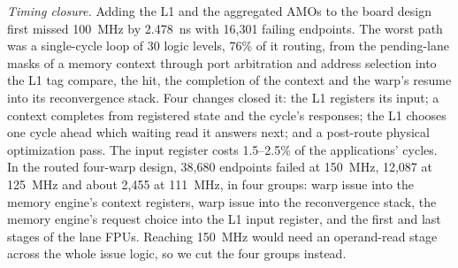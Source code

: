 \emph{Timing closure.} Adding the L1 and the aggregated AMOs to the board design first
missed 100~MHz by 2.478~ns with 16,301 failing endpoints. The worst path was a
single-cycle loop of 30 logic levels, 76\% of it routing, from the pending-lane masks of
a memory context through port arbitration and address selection into the L1 tag
compare, the hit, the completion of the context and the warp's resume into its
reconvergence stack. Four changes closed it: the L1 registers its input; a context
completes from registered state and the cycle's responses; the L1 chooses one cycle
ahead which waiting read it answers next; and a post-route physical optimization pass.
The input register costs 1.5--2.5\% of the applications' cycles. In the routed
four-warp design, 38,680 endpoints failed at 150~MHz, 12,087 at 125~MHz and about 2,455
at 111~MHz, in four groups: warp issue into the memory engine's context registers, warp
issue into the reconvergence stack, the memory engine's request choice into the L1 input
register, and the first and last stages of the lane FPUs. Reaching 150~MHz would need an
operand-read stage across the whole issue logic, so we cut the four groups instead.
